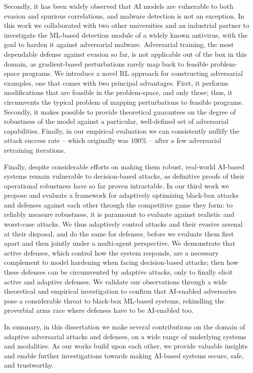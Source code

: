 Secondly, it has been widely observed that \gls{AI} models are vulnerable to both evasion and spurious correlations, and malware detection is not an exception.
In this work we collaborated with two other universities and an industrial partner to investigate the \gls{ML}-based detection module of a widely known antivirus, with the goal to harden it against adversarial malware.
Adversarial training, the most dependable defense against evasion so far, is not applicable out of the box in this domain, as gradient-based perturbations rarely map back to feasible problem-space programs.
We introduce a novel \gls{RL} approach for constructing adversarial examples, one that comes with two principal advantages.
First, it performs modifications that are feasible in the problem-space, and only those; thus, it circumvents the typical problem of mapping perturbations to feasible programs.
Secondly, it makes possible to provide theoretical guarantees on the degree of robustness of the model against a particular, well-defined set of adversarial capabilities.
Finally, in our empirical evaluation we can consistently nullify the attack success rate -- which originally was 100\% -- after a few adversarial retraining iterations.

Finally, despite considerable efforts on making them robust, real-world AI-based systems remain vulnerable to decision-based attacks, as definitive proofs of their operational robustness have so far proven intractable.
In our third work we propose and evaluate a framework for adaptively optimizing black-box attacks and defenses against each other through the competitive game they form: to reliably measure robustness, it is paramount to evaluate against realistic and worst-case attacks.
We thus adaptively control attacks and their evasive arsenal at their disposal, and do the same for defenses, before we evaluate them first apart and then jointly under a multi-agent perspective.
We demonstrate that active defenses, which control how the system responds, are a necessary complement to model hardening when facing decision-based attacks; then how these defenses can be circumvented by adaptive attacks, only to finally elicit active and adaptive defenses.
We validate our observations through a wide theoretical and empirical investigation to confirm that AI-enabled adversaries pose a considerable threat to black-box ML-based systems, rekindling the proverbial arms race where defenses have to be AI-enabled too.

In summary, in this dissertation we make several contributions on the domain of adaptive adversarial attacks and defenses, on a wide range of underlying systems and modalities.
As our works build upon each other, we provide valuable insights and enable further investigations towards making \gls{AI}-based systems secure, safe, and trustworthy.


\cleardoublepage

